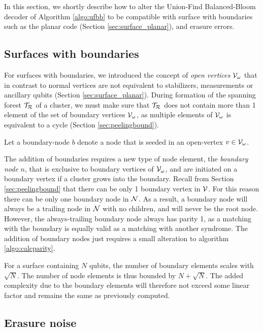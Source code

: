 In this section, we shortly describe how to alter the Union-Find Balanced-Bloom decoder of Algorithm \ref{algo:ufbb} to be compatible with surface with boundaries such as the planar code (Section \ref{sec:surface_planar}), and erasure errors. 

\subsection{Surfaces with boundaries}\label{sec:ufbbbound}
For surfaces with boundaries, we introduced the concept of \emph{open vertices} $\mathcal{V}_\omega$ that in contrast to normal vertices are not equivalent to stabilizers, measurements or ancillary qubits (Section \ref{sec:surface_planar}). During formation of the spanning forest $\mathcal{T}_{\mathcal{R}}$ of a cluster, we must make sure that $\mathcal{T}_{\mathcal{R}}$ does not contain more than 1 element of the set of boundary vertices $\mathcal{V}_\omega$, as multiple elements of $\mathcal{V}_\omega$ is equivalent to a cycle (Section \ref{sec:peelingbound}).
\begin{definition}\label{def:boundarynode}
  Let a boundary-node $b$ denote a node that is seeded in an open-vertex $v \in \mathcal{V}_\omega$. 
\end{definition}
The addition of boundaries requires a new type of node element, the \emph{boundary node} $n$, that is exclusive to boundary vertices of $\mathcal{V}_\omega$, and are initiated on a boundary vertex if a cluster grows into the boundary. Recall from Section \ref{sec:peelingbound} that there can be only 1 boundary vertex in $\mathcal{V}$. For this reason there can be only one boundary node in $\mathcal{N}$. As a result, a boundary node will always be a trailing node in $\mathcal{N}$ with no children, and will never be the root node. However, the always-trailing boundary node  always has parity 1, as a matching with the boundary is equally valid as a matching with another syndrome. The addition of boundary nodes just requires a small alteration to algorithm \ref{algo:calcparity}.


For a surface containing $N$ qubits, the number of boundary elements scales with $\sqrt{N}$. The number of node elements is thus bounded by $N + \sqrt{N}$. The added complexity due to the boundary elements will therefore not exceed some linear factor and remains the same as previously computed.

\subsection{Erasure noise}\label{sec:ufbberasure}

